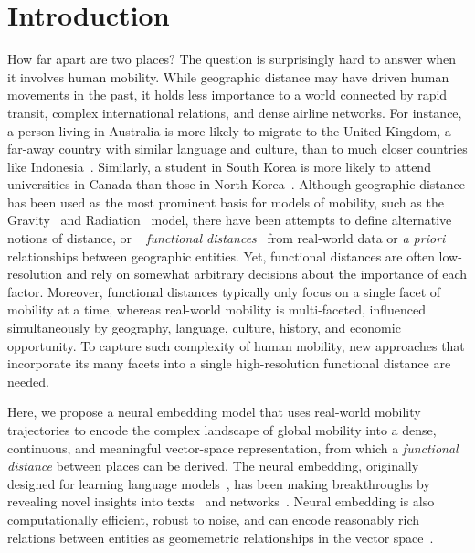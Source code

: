 \documentclass[12pt]{article} %
\begin{document}
%
%
\section{Introduction}\label{sec:introduction} %


How far apart are two places?
The question is surprisingly hard to answer when it involves human mobility.
While geographic distance may have driven human movements in the past, it holds less importance to a world connected by rapid transit, complex international relations, and dense airline networks.
For instance, a person living in Australia is more likely to migrate to the United Kingdom, a far-away country with similar language and culture, than to much closer countries like Indonesia~\autocite{pew2018migration}.
Similarly, a student in South Korea is more likely to attend universities in Canada than those in North Korea~\autocite{unesco2019students}.
Although geographic distance has been used as the most prominent basis for models of mobility, such as the Gravity~\autocite{zipf1946gravity} and Radiation~\autocite{simini2012universal} model, there have been attempts to define alternative notions of distance, or ~ \textit{functional distances}~\autocite{boschma2005proximity, brown1970functional, brown1970migration, kim2018functional} from real-world data or \textit{a priori} relationships between geographic entities.
Yet, functional distances are often low-resolution and rely on somewhat arbitrary decisions about the importance of each factor.
Moreover, functional distances typically only focus on a single facet of mobility at a time, whereas real-world mobility is multi-faceted, influenced simultaneously by geography, language, culture, history, and economic opportunity.
To capture such complexity of human mobility, new approaches that incorporate its many facets into a single high-resolution functional distance are needed.

			
Here, we propose a neural embedding model that uses real-world mobility trajectories to encode the complex landscape of global mobility into a dense, continuous, and meaningful vector-space representation, from which a \textit{functional distance} between places can be derived.
The neural embedding, originally designed for learning language models~\autocite{mikolov2013word2vec}, has been  making breakthroughs by revealing novel insights into texts~\autocite{linzhuo2020hyperbolic, tshitoyan2019mat2vec, garg2018gender, kozlowski2018geometry, hamilton2016diachronic, le2014doc2vec, nakandala2016twitch} and networks~\autocite{perozzi2014deepwalk, grover2016node2vec}.
Neural embedding is also computationally efficient, robust to noise, and can encode reasonably rich relations between entities as geomemetric relationships in the vector space~\autocite{levy2014neural, nakandala2017gendered, kozlowski2018geometry, an2018semaxis}.
\end{document}
